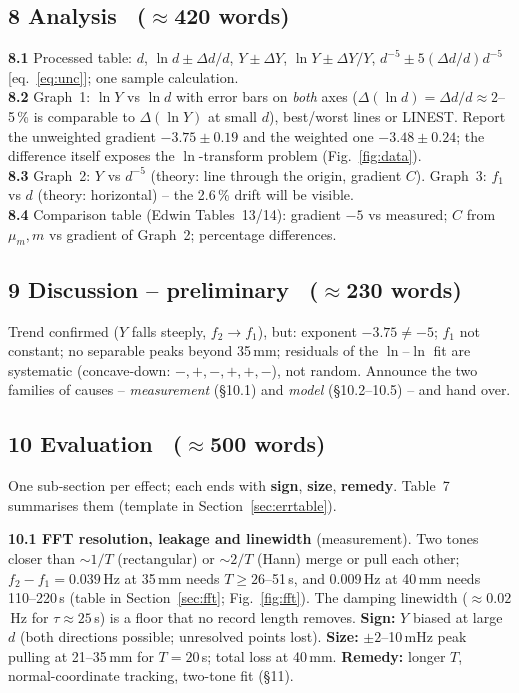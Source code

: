 \documentclass[11pt,a4paper]{article}
\newcommand{\Y}{Y}                       %
\newcommand{\mum}{\mu_m}
\newcommand{\words}[1]{~{\small\color{gray}($\approx$#1 words)}}
\newcommand{\sign}[1]{\textbf{Sign:} #1}
\newcommand{\size}[1]{\textbf{Size:} #1}
\newcommand{\remedy}[1]{\textbf{Remedy:} #1}
\begin{document}
\subsection*{8 Analysis \words{420}}
\textbf{8.1} Processed table: $d$, $\ln d\pm\Delta d/d$, $\Y\pm\Delta\Y$,
$\ln\Y\pm\Delta\Y/\Y$, $d^{-5}\pm5(\Delta d/d)d^{-5}$ [eq.~\eqref{eq:unc}]; one sample
calculation.\\
\textbf{8.2} Graph~1: $\ln\Y$ vs $\ln d$ with error bars on \emph{both} axes
($\Delta(\ln d)=\Delta d/d\approx2$--5\,\% is comparable to $\Delta(\ln\Y)$ at small $d$),
best/worst lines or LINEST. Report the unweighted gradient $-3.75\pm0.19$ and the weighted one
$-3.48\pm0.24$; the difference itself exposes the $\ln$-transform problem
(Fig.~\ref{fig:data}).\\
\textbf{8.3} Graph~2: $\Y$ vs $d^{-5}$ (theory: line through the origin, gradient $C$).
Graph~3: $f_1$ vs $d$ (theory: horizontal) -- the 2.6\,\% drift will be visible.\\
\textbf{8.4} Comparison table (Edwin Tables~13/14): gradient $-5$ vs measured; $C$ from
$\mum,m$ vs gradient of Graph~2; percentage differences.

\subsection*{9 Discussion -- preliminary \words{230}}
Trend confirmed ($\Y$ falls steeply, $f_2\to f_1$), but: exponent $-3.75\neq-5$; $f_1$ not
constant; no separable peaks beyond 35\,mm; residuals of the $\ln$--$\ln$ fit are systematic
(concave-down: $-,+,-,+,+,-$), not random. Announce the two families of causes --
\emph{measurement} (\S10.1) and \emph{model} (\S10.2--10.5) -- and hand over.

\subsection*{10 Evaluation \words{500}}
One sub-section per effect; each ends with \textbf{sign}, \textbf{size}, \textbf{remedy}.
Table~7 summarises them (template in Section~\ref{sec:errtable}).

\textbf{10.1 FFT resolution, leakage and linewidth} (measurement). Two tones closer than
$\sim1/T$ (rectangular) or $\sim2/T$ (Hann) merge or pull each other; $f_2-f_1=0.039$\,Hz at
35\,mm needs $T\ge26$--51\,s, and 0.009\,Hz at 40\,mm needs 110--220\,s (table in
Section~\ref{sec:fft}; Fig.~\ref{fig:fft}). The damping linewidth ($\approx0.02$\,Hz for
$\tau\approx25$\,s) is a floor that no record length removes.
\sign{$\Y$ biased at large $d$ (both directions possible; unresolved points lost).}
\size{$\pm2$--10\,mHz peak pulling at 21--35\,mm for $T=20$\,s; total loss at 40\,mm.}
\remedy{longer $T$, normal-coordinate tracking, two-tone fit (\S11).}
\end{document}
